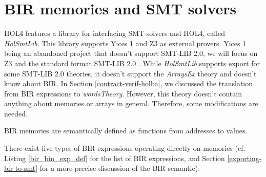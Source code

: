 \documentclass{kththesis}
\begin{document}
{

\section{BIR memories and SMT solvers} \label{bir-memories-with-smt-solvers}


HOL4 features a library for interfacing \gls{SMT} solvers and HOL4, called \textit{HolSmtLib}. This library supports Yices 1 and Z3 as external provers. Yices 1 being an abandoned project that doesn't support SMT-LIB 2.0, we will focus on Z3 and the standard format SMT-LIB 2.0 \cite{barrett_satisfiability_2016}. While \textit{HolSmtLib} supports export for some SMT-LIB 2.0 theories, it doesn't support the \textit{ArraysEx} theory and doesn't know about BIR. In Section \ref{contract-verif-holba}, we discussed the translation from BIR expressions to \textit{wordsTheory}. However, this theory doesn't contain anything about memories or arrays in general. Therefore, some modifications are needed.

BIR memories are semantically defined as functions from addresses to values. 

There exist five types of BIR expressions operating directly on memories (cf. Listing \ref{bir_bin_exp_def} for the list of BIR expressions, and Section \ref{exporting-bir-to-smt} for a more precise discussion of the BIR semantic):

}
\end{document}
